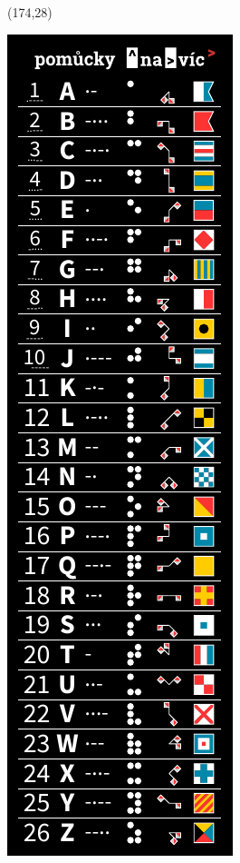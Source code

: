 \documentclass{extarticle}
\begin{document}
\begin{textblock}{42}(174,28)
\vfill
{\centerline{\includegraphics[scale=1,]{front.pdf}}} 
\vfill
\end{textblock}
\end{document}
